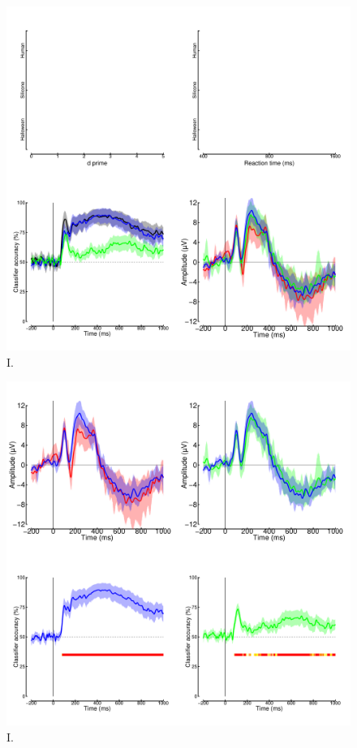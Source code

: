 \documentclass[
]{article}
\begin{document}
\begin{figure}

{\centering \includegraphics{Figures/MaskData} 

}

\caption{I.}\label{fig:MasksData}
\end{figure}

\begin{figure}

{\centering \includegraphics{Figures/MaskMVPA} 

}

\caption{I.}\label{fig:MasksMVPA}
\end{figure}
\end{document}
